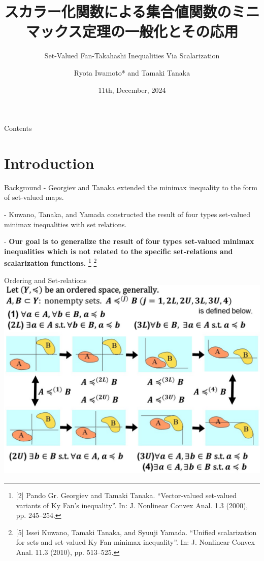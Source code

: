 \documentclass[aspectratio=169, dvipdfmx, 11pt]{beamer}
\title{スカラー化関数による集合値関数のミニマックス定理の一般化とその応用}
\subtitle{Set-Valued Fan-Takahashi Inequalities Via Scalarization}
\author[Ryota Iwamoto]{Ryota Iwamoto* and Tamaki Tanaka}
\institute[Niigata Univ]{Niigata Univ}
\date{11th, December, 2024}
\begin{document}
\maketitle

\begin{frame}{Contents}
  \tableofcontents
\end{frame}

\section{Introduction}

\begin{frame}{Background}
  - Georgiev and Tanaka \cite{MR1807037} extended the minimax inequality to the form of set-valued maps.

  - Kuwano, Tanaka, and Yamada \cite{MR2778674} constructed the result of four types set-valued minimax inequalities
  with set relations.

  - \textbf{Our goal is to generalize the result of four types set-valued minimax inequalities which is not related to the specific set-relations and scalarization functions.}
  \renewcommand{\thefootnote}{\fnsymbol{footnote}}%
  \footnote[0]{[2] Pando Gr. Georgiev and Tamaki Tanaka. “Vector-valued set-valued variants of
    Ky Fan's inequality”. In: J. Nonlinear Convex Anal. 1.3 (2000), pp. 245--254.}
  \footnote[0]{[5] Issei Kuwano, Tamaki Tanaka, and Syuuji Yamada. “Uniﬁed scalarization for
    sets and set-valued Ky Fan minimax inequality”. In: J. Nonlinear Convex Anal.
    11.3 (2010), pp. 513--525.}
\end{frame}

\begin{frame}{Ordering and Set-relations}
  \centering
  \includegraphics[keepaspectratio, scale=0.28]{figures/eps/set-relations_3.eps}
\end{frame}
\end{document}
